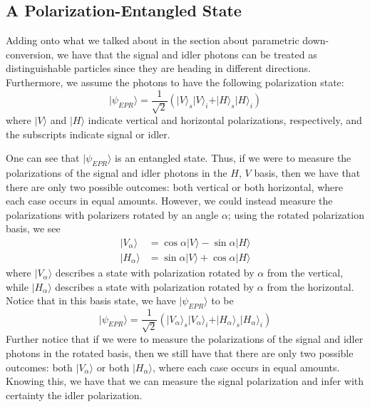 \documentclass[twocolumn,amsmath,amssymb,pra]{revtex4-2}
\begin{document}
\subsection{A Polarization-Entangled State}
Adding onto what we talked about in the section about parametric down-conversion, we have that the signal and idler photons can be treated as distinguishable particles since they are heading in different directions. Furthermore, we assume the photons to have the following polarization state: 
\begin{equation}
    \vert \psi_{EPR} \rangle 
    =
    \frac{1}{\sqrt{2}} 
    \left(
        \vert V \rangle_{s} \vert V \rangle_{i} + \vert H \rangle_{s} \vert H \rangle_{i}
    \right)
\end{equation}
where $\vert V \rangle$ and $\vert H \rangle$ indicate vertical and horizontal polarizations, respectively, and the subscripts indicate signal or idler. 

One can see that $\vert \psi_{EPR} \rangle$ is an entangled state. Thus, if we were to measure the polarizations of the signal and idler photons in the $H$, $V$ basis, then we have that there are only two possible outcomes: both vertical or both horizontal, where each case occurs in equal amounts. However, we could instead measure the polarizations with polarizers rotated by an angle $\alpha$; using the rotated polarization basis, we see 
\begin{equation}
    \begin{aligned}
        \vert V_{\alpha} \rangle
        &=
        \cos \alpha \vert V \rangle  - \sin \alpha \vert H \rangle 
        \\[2mm]
        \vert H_{\alpha} \rangle
        &=
        \sin \alpha \vert V \rangle  + \cos \alpha \vert H \rangle 
    \end{aligned}
\end{equation}
where $\vert V_{\alpha} \rangle$ describes a state with polarization rotated by $\alpha$ from the vertical, while $\vert H_{\alpha} \rangle$ describes a state with polarization rotated by $\alpha$ from the horizontal. Notice that in this basis state, we have $\vert \psi_{EPR} \rangle$ to be 
\begin{equation}
    \vert \psi_{EPR} \rangle
    =
    \frac{1}{\sqrt{2}} 
    \left(
        \vert V_{\alpha} \rangle_{s} \vert V_{\alpha} \rangle_{i} + \vert H_{\alpha} \rangle_{s} \vert H_{\alpha} \rangle_{i}
    \right)
\end{equation}
Further notice that if we were to measure the polarizations of the signal and idler photons in the rotated basis, then we still have that there are only two possible outcomes: both $\vert V_{\alpha} \rangle$ or both $\vert H_{\alpha} \rangle$, where each case occurs in equal amounts. Knowing this, we have that we can measure the signal polarization and infer with certainty the idler polarization.
\end{document}
